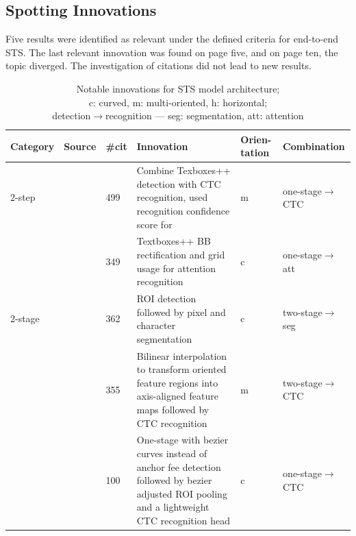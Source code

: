 \subsection{Spotting Innovations}
Five results were identified as relevant under the defined criteria for end-to-end \ac{STS}.
The last relevant innovation was found on page five, and on page ten, the topic diverged.
The investigation of citations did not lead to new results.
\begin{table}[h]
    \centering\scriptsize
    \begin{tabular}{p{}p{}p{}p{}
            p{}p{}}
    \textbf{Category} & \textbf{Source} & \textbf{\#cit} & \textbf{Innovation} &
                                        \textbf{Orien-tation} & \textbf{Combination} \\
        \toprule
        2-step &~\cite{liao_textboxes_2018} & 499 & Combine Texboxes++ detection with CTC
            recognition, used recognition confidence score for & m & one-stage$\rightarrow$CTC\\
            &~\cite{shi_aster_2019} & 349 & Textboxes++ BB rectification and grid usage for
                attention recognition & c & one-stage$\rightarrow$att \\
        2-stage &~\cite{lyu_mask_2018} & 362 & ROI detection followed by pixel and character
            segmentation & c & two-stage$\rightarrow$seg \\
            &~\cite{liu_fots_2018} & 355 & Bilinear interpolation to transform oriented feature
                regions into axis-aligned feature maps followed by CTC recognition
            & m & two-stage$\rightarrow$CTC\\
            &~\cite{liu_abcnet_2020} & 100 & One-stage with bezier curves instead of anchor fee
                detection followed by bezier adjusted ROI pooling and a lightweight CTC
                recognition head & c & one-stage$\rightarrow$CTC  \\
        \bottomrule
    \end{tabular}
    \captionsetup{justification=centering}
    \caption[Notable innovations for STS model architecture]{%
        Notable innovations for STS model architecture; \\
        c: curved, m: multi-oriented, h: horizontal; \\
        detection$\rightarrow$recognition --- seg: segmentation, att:
        attention\label{tb:E2E-steps-properties}
    }
\end{table}


